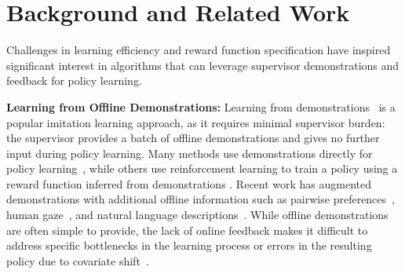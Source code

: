 \section{Background and Related Work}
\label{sec:related-work}
Challenges in learning efficiency and reward function specification have inspired significant interest in algorithms that can leverage supervisor demonstrations and feedback for policy learning.

\textbf{Learning from Offline Demonstrations: }
Learning from demonstrations~\cite{argall2009survey,osa2018algorithmic,arora2018survey} is a popular imitation learning approach, as it requires minimal supervisor burden: the supervisor provides a batch of offline demonstrations and gives no further input during policy learning. Many methods use demonstrations directly for policy learning~\cite{pomerleau1991efficient,ijspeert2013dynamical,paraschos2013probabilistic,torabi2018behavioral}, while others use reinforcement learning to train a policy using a reward function inferred from demonstrations \cite{abbeel2004apprenticeship,ziebart2008maximum,ho2016generative,brown2019drex,airl}. Recent work has augmented demonstrations with additional offline information such as pairwise preferences~\cite{browngoo2019trex,brown2020safe}, human gaze~\cite{gaze_saran}, and natural language descriptions~\cite{tung2018reward}. While offline demonstrations are often simple to provide, the lack of online feedback makes it difficult to address specific bottlenecks in the learning process or errors in the resulting policy due to covariate shift~\cite{dagger}.



